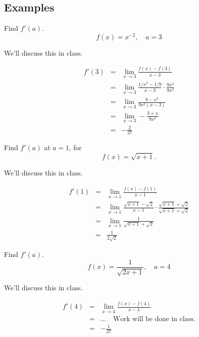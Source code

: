 \documentclass[12pt,addpoints, answers, fleqn]{exam}
\begin{document}
 
 
\subsection{Examples}
\begin{questions}


\question Find $f'\left(a\right)$.
\[
f\left(x\right) = x^{-2}, \quad a = 3
\]

\begin{solution}
We'll discuss this in class.

\begin{eqnarray*}
f'\left( 3 \right) &=& \lim_{x \to 3 }  \frac{f \left( x \right) - f \left( 3 \right)}{x-3}\\
&=& \lim_{x \to 3 }  \frac{1/x^2 - 1/9}{x-3} \cdot \frac{9x^2}{9x^2}\\
&=& \lim_{x \to 3 } \frac{9-x^2}{9x^2\left(x-3\right)}\\
&=& \lim_{x \to 3 } -\frac{3+x}{9x^2}\\
&=& -\frac{2}{27}
\end{eqnarray*}
\end{solution}



\question Find $f'\left(a\right)$ at $a=1$, for
\[
f \left( x \right) = \sqrt{x+1}.
\]

\begin{solution}
We'll discuss this in class.

\begin{eqnarray*}
f'\left( 1 \right) &=& \lim_{x \to 1 }  \frac{f \left( x \right) - f \left( 1 \right)}{x-1}\\
&=&  \lim_{x \to 1 }  \frac{ \sqrt{x+1}  - \sqrt{2} }{x-1} \cdot \frac{\sqrt{x+1} + \sqrt{2}}{\sqrt{x+1} + \sqrt{2}} \\
&=&  \lim_{x \to 1 }   \frac{1}{\sqrt{x+1} + \sqrt{2}} \\
&=& \frac{1}{2\sqrt{2}}
\end{eqnarray*}

\end{solution}



\question Find $f'\left(a\right)$.
\[
f\left(x\right) = \frac{1}{\sqrt{2x+1}}, \quad a = 4
\]

\begin{solution}
We'll discuss this in class.

\begin{eqnarray*}
f'\left( 4 \right) &=& \lim_{x \to 4 }  \frac{f \left( x \right) - f \left( 4 \right)}{x-4}\\
&=& \ldots \quad \mbox{Work will be done in class.}\\
&=& -\frac{1}{27}
\end{eqnarray*}
\end{solution}


\end{questions}
\end{document}
